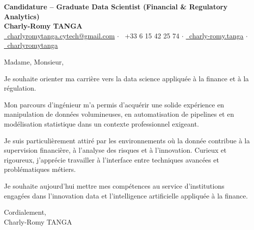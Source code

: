 \documentclass[10pt, letterpaper]{article}
\begin{document}
\begin{center}
    \textbf{\LARGE Candidature -- Graduate Data Scientist (Financial \& Regulatory Analytics)} \\[0.2cm]
    \textbf{\large Charly-Romy TANGA} \\[0.2cm]
    \href{mailto:charlyromytanga.cytech@gmail.com}{\faEnvelope\ charlyromytanga.cytech@gmail.com}
    \quad$\cdot$\quad
    \faPhone\ +33 6 15 42 25 74
    \quad$\cdot$\quad
    \href{https://www.linkedin.com/in/charly-romy-tanga}{\faLinkedin\ charly-romy.tanga}
    \quad$\cdot$\quad
    \href{https://github.com/charlyromytanga}{\faGithub\ charlyromytanga}
\end{center}

Madame, Monsieur,

Je souhaite orienter ma carrière vers la data science appliquée à la finance et à la régulation.

Mon parcours d'ingénieur m'a permis d'acquérir une solide expérience en manipulation de données volumineuses, en automatisation de pipelines et en modélisation statistique dans un contexte professionnel exigeant.

Je suis particulièrement attiré par les environnements où la donnée contribue à la supervision financière, à l'analyse des risques et à l'innovation. Curieux et rigoureux, j'apprécie travailler à l'interface entre techniques avancées et problématiques métiers.

Je souhaite aujourd'hui mettre mes compétences au service d'institutions engagées dans l'innovation data et l'intelligence artificielle appliquée à la finance.

Cordialement,\\
Charly-Romy TANGA
\end{document}
